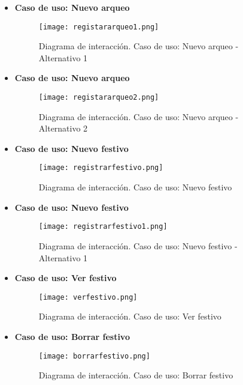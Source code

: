 \begin{itemize}
\newpage

\item \textbf{Caso de uso: Nuevo arqueo}
\begin{figure}[!htb]
  \centering
    \texttt{[image: registararqueo1.png]}
  \caption{Diagrama de interacción. Caso de uso: Nuevo arqueo - Alternativo 1}
  \label{a}
\end{figure}

\item \textbf{Caso de uso: Nuevo arqueo}
\begin{figure}[!htb]
  \centering
    \texttt{[image: registararqueo2.png]}
  \caption{Diagrama de interacción. Caso de uso: Nuevo arqueo - Alternativo 2}
  \label{a}
\end{figure}

\item \textbf{Caso de uso: Nuevo festivo}
\begin{figure}[!htb]
  \centering
    \texttt{[image: registrarfestivo.png]}
  \caption{Diagrama de interacción. Caso de uso: Nuevo festivo}
  \label{a}
\end{figure}

\newpage
\item \textbf{Caso de uso: Nuevo festivo}
\begin{figure}[!htb]
  \centering
    \texttt{[image: registrarfestivo1.png]}
  \caption{Diagrama de interacción. Caso de uso: Nuevo festivo - Alternativo 1}
  \label{a}
\end{figure}

\item \textbf{Caso de uso: Ver festivo}
\begin{figure}[!htb]
  \centering
    \texttt{[image: verfestivo.png]}
  \caption{Diagrama de interacción. Caso de uso: Ver festivo}
  \label{a}
\end{figure}

\item \textbf{Caso de uso: Borrar festivo}
\begin{figure}[!htb]
  \centering
    \texttt{[image: borrarfestivo.png]}
  \caption{Diagrama de interacción. Caso de uso: Borrar festivo}
  \label{a}
\end{figure}






\end{itemize}

